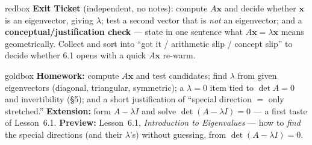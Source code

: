 \documentclass[10pt]{article}
\newcommand{\xx}{\mathbf{x}}
\begin{document}
\begin{skillbox}{redbox}
\textbf{Exit Ticket} (independent, no notes): compute $A\xx$ and decide whether $\xx$ is an
eigenvector, giving $\lambda$; test a second vector that is \emph{not} an eigenvector; and a
\textbf{conceptual/justification check} --- state in one sentence what $A\xx=\lambda\xx$ means
geometrically. Collect and sort into ``got it / arithmetic slip / concept slip'' to decide whether
6.1 opens with a quick $A\xx$ re-warm.
\end{skillbox}

\begin{skillbox}{goldbox}
\textbf{Homework:} compute $A\xx$ and test candidates; find $\lambda$ from given eigenvectors
(diagonal, triangular, symmetric); a $\lambda=0$ item tied to $\det A=0$ and invertibility (§5); and a
short justification of ``special direction $=$ only stretched.'' \textbf{Extension:} form $A-\lambda I$
and solve $\det(A-\lambda I)=0$ --- a first taste of Lesson~6.1. \textbf{Preview:} Lesson~6.1,
\emph{Introduction to Eigenvalues} --- how to \emph{find} the special directions (and their $\lambda$'s)
without guessing, from $\det(A-\lambda I)=0$.
\end{skillbox}
\end{document}
